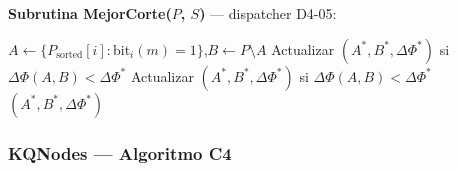 \bigskip

\textbf{Subrutina MejorCorte($P$, $S$)} — dispatcher D4-05:

\begin{algorithm}[H]
\caption{MejorCorte — dispatcher exhaustivo / guiado por $S$}
\label{alg:mejor_corte}
\begin{algorithmic}[1]
  
    \State $A \leftarrow \{P_{\text{sorted}}[i] : \text{bit}_i(m) = 1\}$,\quad $B \leftarrow P \setminus A$
    \State Actualizar $(A^*, B^*, \Delta\Phi^*)$ si $\Delta\Phi(A,B) < \Delta\Phi^*$
  \EndFor
\Else  {}
    \State Actualizar $(A^*, B^*, \Delta\Phi^*)$ si $\Delta\Phi(A,B) < \Delta\Phi^*$
  \EndFor
\EndIf
\State \Return $(A^*, B^*, \Delta\Phi^*)$
\end{algorithmic}
\end{algorithm}

\bigskip

\subsubsection*{KQNodes — Algoritmo C4}

